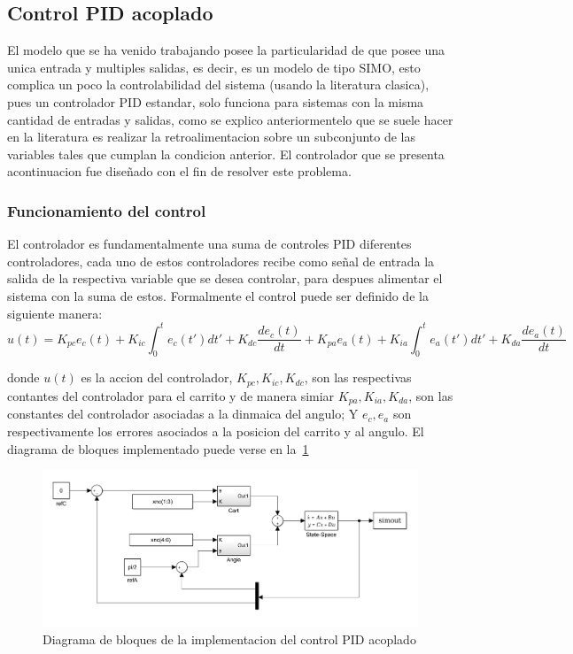\subsection{Control PID acoplado}
El modelo que se ha venido trabajando posee la particularidad de que posee una unica entrada
y multiples salidas, es decir, es un modelo de tipo SIMO, esto complica un poco la
controlabilidad del sistema (usando la literatura clasica), pues un controlador PID estandar,
solo funciona para sistemas con la misma cantidad de entradas y salidas, como se explico
anteriormentelo que se suele hacer en la literatura es realizar la retroalimentacion sobre
un subconjunto de las variables tales que cumplan la condicion anterior.
El controlador que se presenta acontinuacion fue diseñado con el fin de resolver este
problema.
\subsubsection{Funcionamiento del control}
El controlador es fundamentalmente una suma de controles PID diferentes controladores,
cada uno de estos controladores recibe como señal de entrada la salida de la respectiva
variable que se desea controlar, para despues alimentar el sistema con la suma de estos.
Formalmente el control puede ser definido de la siguiente manera:
\[
  u(t) = K_{pc}e_c(t) + K_{ic}\int_0^te_c(t')dt' + K_{dc}\dfrac{de_{c}(t)}{dt} +
   K_{pa}e_a(t) + K_{ia}\int_0^te_a(t')dt' + K_{da}\dfrac{de_{a}(t)}{dt}  
\]

donde $u(t)$ es la accion del controlador, $K_{pc}, K_{ic}, K_{dc}$, son las respectivas
contantes del controlador para el carrito y de manera simiar $K_{pa}, K_{ia}, K_{da}$,
son las constantes del controlador asociadas a la dinmaica del angulo; Y $e_c, e_a$ son
respectivamente los errores asociados a la posicion del carrito y al angulo.
El diagrama de bloques implementado puede verse en la~\ref{fig:controlS}

\begin{figure}[t]
  \label{fig:controlS}
  \includegraphics[scale=1]{Figuras/control-modelo.jpg}
  \caption{Diagrama de bloques de la implementacion del control PID acoplado} 
\end{figure}

